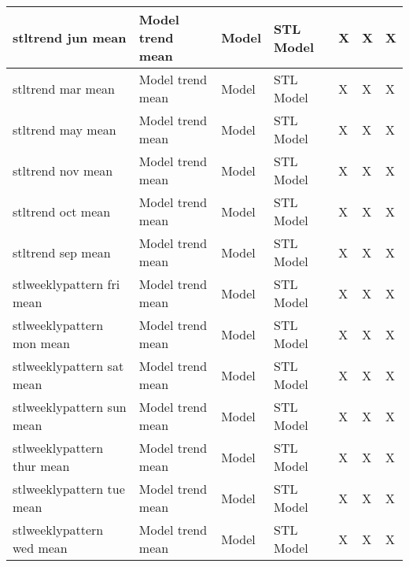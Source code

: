 {{\begin{longtable}[l]{ | p{4cm} | p{4cm} | p{1cm} | p{2cm} | p{0.3cm} | p{0.3cm} | p{0.3cm} |}
	 stltrend jun mean & Model trend mean & Model & STL Model & X & X & X \\ \hline
	 stltrend mar mean & Model trend mean & Model & STL Model & X & X & X \\ \hline
	 stltrend may mean & Model trend mean & Model & STL Model & X & X & X \\ \hline
	 stltrend nov mean & Model trend mean & Model & STL Model & X & X & X \\ \hline
	 stltrend oct mean & Model trend mean & Model & STL Model & X & X & X \\ \hline
	 stltrend sep mean & Model trend mean & Model & STL Model & X & X & X \\ \hline
	 stlweeklypattern fri mean & Model trend mean & Model & STL Model & X & X & X \\ \hline
	 stlweeklypattern mon mean & Model trend mean & Model & STL Model & X & X & X \\ \hline
	 stlweeklypattern sat mean & Model trend mean & Model & STL Model & X & X & X \\ \hline
	 stlweeklypattern sun mean & Model trend mean & Model & STL Model & X & X & X \\ \hline
	 stlweeklypattern thur mean & Model trend mean & Model & STL Model & X & X & X \\ \hline
	 stlweeklypattern tue mean & Model trend mean & Model & STL Model & X & X & X \\ \hline
	 stlweeklypattern wed mean & Model trend mean & Model & STL Model & X & X & X \\ \hline
\end{longtable}
	
}}
